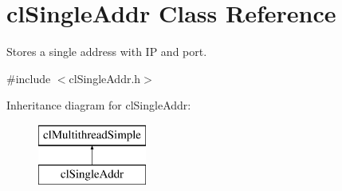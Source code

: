 \hypertarget{classcl_single_addr}{
\section{clSingleAddr Class Reference}
\label{classcl_single_addr}
}


Stores a single address with IP and port.  




{\ttfamily \#include $<$clSingleAddr.h$>$}

Inheritance diagram for clSingleAddr:\begin{figure}[H]
\begin{center}
\leavevmode
\includegraphics[height=2.000000cm]{classcl_single_addr}
\end{center}
\end{figure}
